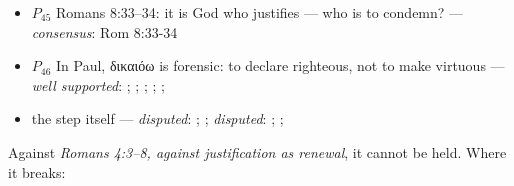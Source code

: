 \documentclass[11pt]{article}
\begin{document}
\begin{itemize}
\begin{itemize}
\item \(P_{45}\) Romans 8:33–34: it is God who justifies — who is to condemn? --- \emph{consensus}: Rom 8:33-34
\item \(P_{46}\) In Paul, δικαιόω is forensic: to declare righteous, not to make virtuous --- \emph{well supported}: \cite[s.v. δικαιόω]{bauer-danker-lexicon-2000}; \cite{morris-apostolic-preaching-1965}; \cite[p. 80]{moo-romans-1996}; \cite{irons-righteousness-of-god-2015}; \cite{wright-justification-2009}; \cite[ad loc. Rom 3:24]{fitzmyer-romans-1993}
\item the step itself --- \emph{disputed}: \cite[ad loc. Gal 1:6]{moo-galatians-2013}; \cite[XI.1]{westminster-confession-1647}; \emph{disputed}: \cite[XI.1]{westminster-confession-1647}; \cite[III.xi.2]{calvin-institutes-1960}; \cite{morris-apostolic-preaching-1965}
\end{itemize}
\end{itemize}
Against \emph{Romans 4:3–8, against justification as renewal}, it cannot be held. Where it breaks:
\end{document}
